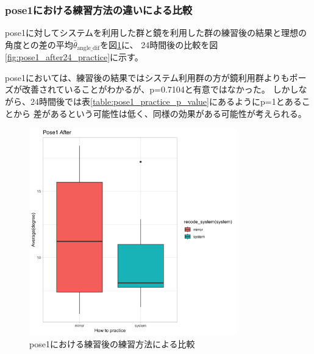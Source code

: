     \subsubsection{pose1における練習方法の違いによる比較}
      pose1に対してシステムを利用した群と鏡を利用した群の練習後の結果と理想の角度との差の平均\(\bar{\theta}_{\text{angle\_dif}}\)を図\ref{fig:pose1_after_practice}に、
      24時間後の比較を図\ref{fig:pose1_after24_practice}に示す。

      pose1においては、練習後の結果ではシステム利用群の方が鏡利用群よりもポーズが改善されていることがわかるが、p=0.7104と有意ではなかった。
      しかしながら、24時間後では表\ref{table:pose1_practice_p_value}にあるようにp=1とあることから
      差があるという可能性は低く、同様の効果がある可能性が考えられる。

      \begin{figure}[H]
        \begin{center}
        \includegraphics[width=9cm]{figures/pose1_after_boxplot.png}
        \caption{pose1における練習後の練習方法による比較}
        \label{fig:pose1_after_practice}
        \end{center}
      \end{figure}


